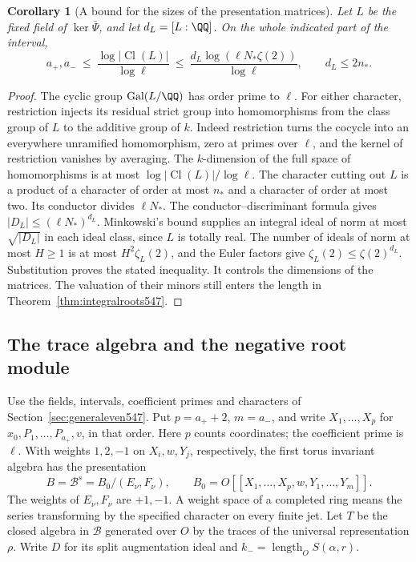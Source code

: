 \documentclass[a4paper,11pt]{article}
\newtheorem{corollary}[proposition]{Corollary}
\theoremstyle{definition}
\theoremstyle{remark}
\numberwithin{equation}{section}
\newcommand{\Cl}{\operatorname{Cl}}
\begin{document}
\begin{corollary}[A bound for the sizes of the presentation matrices]
\leavevmode\label{cor:rootranks547}
Let \(L\) be the fixed field of \(\ker\bar\Psi\), and let \(d_L=[L:\QQ]\).
On the whole indicated part of the interval,
\[
 a_+,a_-\ \le\ \frac{\log|\Cl(L)|}{\log\ell}
 \ \le\ \frac{d_L\log(\ell N_*\zeta(2))}{\log\ell},
 \qquad d_L\le 2n_* .
\]
\end{corollary}
\begin{proof}
The cyclic group \(\operatorname{Gal}(L/\QQ)\) has order prime to
\(\ell\). For either character, restriction injects its residual
strict group into homomorphisms from the class group of \(L\) to
the additive group of \(k\). Indeed restriction turns the cocycle
into an everywhere unramified homomorphism, zero at primes over
\(\ell\), and the kernel of restriction vanishes by averaging.
The \(k\)-dimension of the full space of homomorphisms is at most
\(\log|\Cl(L)|/\log\ell\). The character cutting out \(L\) is a
product of a character of order at most \(n_*\) and a character
of order at most two. Its conductor divides \(\ell N_*\). The
conductor--discriminant formula gives \(|D_L|\le(\ell N_*)^{d_L}\).
Minkowski's bound supplies an integral ideal of norm at most
\(\sqrt{|D_L|}\) in each ideal class, since \(L\) is totally
real. The number of ideals of norm at most \(H\ge1\) is at most
\(H^2\zeta_L(2)\), and the Euler factors give
\(\zeta_L(2)\le\zeta(2)^{d_L}\). Substitution proves the stated
inequality. It controls the dimensions of the matrices. The
valuation of their minors still enters the length in
Theorem~\ref{thm:integralroots547}.
\end{proof}


\subsection{The trace algebra and the negative root module}
\label{sec:roottrace548}

Use the fields, intervals, coefficient primes and characters of
Section~\ref{sec:generaleven547}. Put \(p=a_++2\), \(m=a_-\), and
write \(X_1,\ldots,X_p\) for \(x_0,P_1,\ldots,P_{a_+},v\), in
that order. Here \(p\) counts coordinates; the coefficient prime
is \(\ell\). With weights \(1,2,-1\) on \(X_i,w,Y_j\), respectively,
the first torus invariant algebra has the presentation
\[
 B=\mathcal B^s=B_0/(E_\nu,F_\nu),\qquad
 B_0=O[[X_1,\ldots,X_p,w,Y_1,\ldots,Y_m]].
\]
The weights of \(E_\nu,F_\nu\) are \(+1,-1\). A weight space of a
completed ring means the series transforming by the specified
character on every finite jet. Let \(T\) be the closed algebra in
\(\mathcal B\) generated over \(O\) by the traces of the universal
representation \(\rho\). Write \(D\) for its split augmentation
ideal and \(k_-=\operatorname{length}_O S(\alpha,r)\).
\end{document}

